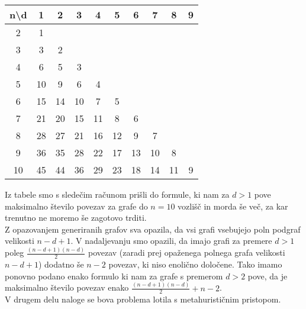 \documentclass[12pt,a4paper]{amsart}
\theoremstyle{definition} %
\theoremstyle{plain} %
\begin{document}
\begin{center}
    \begin{tabular}{||c c c c c c c c c c||} 
     \hline
     n\textbackslash d & 1 & 2 & 3 & 4 & 5 & 6 & 7 & 8 & 9 \\ [0.5ex] 
     \hline\hline
     2 & 1 & & & & & & & & \\ 
     \hline
     3 & 3 & 2 & & & & & & & \\ 
     \hline
     4 & 6 & 5 & 3 & & & & & & \\
     \hline
     5 & 10 & 9 & 6 & 4 & & & & & \\
     \hline
     6 & 15 & 14 & 10 & 7 & 5 & & & & \\ 
     \hline
     7 & 21 & 20 & 15 & 11 & 8 & 6 & & & \\ 
     \hline
     8 & 28 & 27 & 21 & 16 & 12 & 9 & 7 & & \\ 
     \hline
     9 & 36 & 35 & 28 & 22 & 17 & 13 & 10 & 8 & \\ 
     \hline
     10 & 45 & 44 & 36 & 29 & 23 & 18 & 14 & 11 & 9 \\ 
     \hline
    \end{tabular}
\end{center}

Iz tabele smo s sledečim računom prišli do formule, ki nam za $d > 1$ pove maksimalno število povezav za
grafe do $n = 10$ vozlišč in morda še več, za kar trenutno ne moremo še zagotovo trditi.\\


Z opazovanjem generiranih grafov sva opazila, da vsi grafi vsebujejo poln podgraf velikosti $n - d + 1$.
V nadaljevanju smo opazili, da imajo grafi za premere $d > 1$ poleg $\frac{(n - d + 1)(n - d)}{2}$ povezav (zaradi
prej opaženega polnega grafa velikosti $n - d + 1$) dodatno še $n - 2$ povezav, ki niso enolično določene.
Tako imamo ponovno podano enako formulo ki nam za grafe s premerom $d > 2$ pove, da je maksimalno število
povezav enako $\frac{(n - d + 1)(n - d)}{2} + n - 2$.\\


V drugem delu naloge se bova problema lotila s metahurističnim pristopom.
\end{document}
